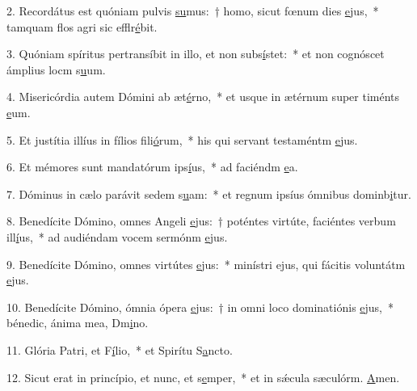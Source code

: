 2. Recordátus est quóniam pulvis \uline{su}mus:~† homo, sicut fœnum dies \uline{e}jus,~* tamquam flos agri sic efflr\uline{é}bit.\par 
3. Quóniam spíritus pertransíbit in illo, et non subs\uline{í}stet:~* et non cognóscet ámplius locm s\uline{u}um.\par 
4. Misericórdia autem Dómini ab æt\uline{é}rno,~* et usque in ætérnum super timénts \uline{e}um.\par 
5. Et justítia illíus in fílios fili\uline{ó}rum,~* his qui servant testaméntm \uline{e}jus.\par 
6. Et mémores sunt mandatórum ips\uline{í}us,~* ad faciéndm \uline{e}a.\par 
7. Dóminus in cælo parávit sedem s\uline{u}am:~* et regnum ipsíus ómnibus dominb\uline{i}tur.\par 
8. Benedícite Dómino, omnes Angeli \uline{e}jus:~† poténtes virtúte, faciéntes verbum ill\uline{í}us,~* ad audiéndam vocem sermónm \uline{e}jus.\par 
9. Benedícite Dómino, omnes virtútes \uline{e}jus:~* minístri ejus, qui fácitis voluntátm \uline{e}jus.\par 
10. Benedícite Dómino, ómnia ópera \uline{e}jus:~† in omni loco dominatiónis \uline{e}jus,~* bénedic, ánima mea, Dm\uline{i}no.\par 
11. Glória Patri, et F\uline{í}lio,~* et Spirítu S\uline{a}ncto.\par 
12. Sicut erat in princípio, et nunc, et s\uline{e}mper,~* et in sǽcula sæculórm. \uline{A}men.\par 
